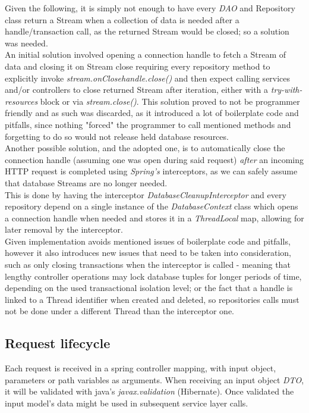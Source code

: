 Given the following, it is simply not enough to have every \textit{DAO} and Repository class return a Stream when a collection
of data is needed after a handle/transaction call, as the returned Stream would be closed; so a solution was needed.\\

An initial solution involved opening a connection handle to fetch a Stream of data and closing it on Stream close requiring every
repository method to explicitly invoke \textit{stream.onClose{handle.close()}} and then expect calling services and/or controllers to close
returned Stream after iteration, either with a \textit{try-with-resources} block or via \textit{stream.close()}. This solution proved to not be programmer
friendly and as such was discarded, as it introduced a lot of boilerplate code and pitfalls, since nothing "forced" the programmer to call mentioned
methods and forgetting to do so would not release held database resources.\\

Another possible solution, and the adopted one, is to automatically close the connection handle (assuming one was open during said request)
\textit{after} an incoming HTTP request is completed using \textit{Spring's} interceptors, as we can safely assume that database Streams are no longer needed.\\

This is done by having the interceptor \textit{DatabaseCleanupInterceptor} and every repository depend on a single instance of the \textit{DatabaseContext} class which opens a
connection handle when needed and stores it in a \textit{ThreadLocal} map, allowing for later removal by the interceptor.\\

Given implementation avoids mentioned issues of boilerplate code and pitfalls, however it also introduces new issues that need to be taken into consideration,
such as only closing transactions when the interceptor is called - meaning that lengthy controller operations may lock database tuples for longer periods of time,
depending on the used transactional isolation level;  or the fact that a handle is linked to a Thread identifier when created and deleted, so repositories calls must
not be done under a different Thread than the interceptor one.

\subsection{Request lifecycle}
Each request is received in a spring controller mapping, with input object,
parameters or path variables as arguments. When receiving an input object \textit{DTO},
it will be validated with java's \textit{javax.validation} (Hibernate).
Once validated the input model's data might be used in subsequent service layer calls.\\

